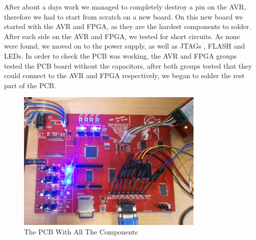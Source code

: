 After about a days work we managed to completely destroy a pin on the AVR, therefore we had to start from scratch on a new board. On this new board we started with the AVR and FPGA, as they are the hardest components to solder. After each side on the AVR and FPGA, we tested for short circuits. As none were found, we moved on to the power supply, as well as JTAGs , FLASH and LEDs. In order to check the PCB was working, the AVR and FPGA groups tested the PCB board without the capacitors, after both groups tested that they could connect to the AVR and FPGA respectively, we began to solder the rest part of the PCB. 
\begin{figure}[h]
  \centering
  \includegraphics[width=0.8\textwidth]{fig/pcb/pcbwithcomp.jpg}
  \caption{The PCB With All The Components}
  \label{fig:pcb}
\end{figure}
